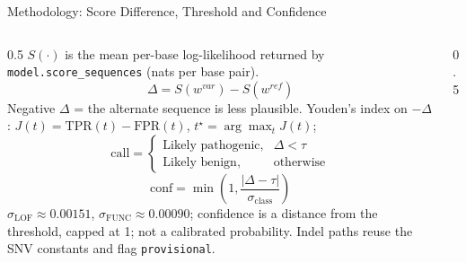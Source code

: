 \documentclass[aspectratio=169,10pt]{beamer}
\begin{document}
\begin{frame}{Methodology: Score Difference, Threshold and Confidence}
\begin{columns}[T]
\begin{column}{0.5\textwidth}
\small $S(\cdot)$ is the mean per-base log-likelihood returned by \texttt{model.score\_sequences} (nats per base pair).
\begin{equation*}
\boxed{\Delta = S(w^{var}) - S(w^{ref})}
\end{equation*}
\small Negative $\Delta$ = the alternate sequence is less plausible.
Youden's index on $-\Delta$: $J(t)=\mathrm{TPR}(t)-\mathrm{FPR}(t)$, $t^{\star}=\arg\max_t J(t)$;
\begin{equation*}
\mathrm{call} = \begin{cases}\text{Likely pathogenic}, & \Delta < \tau\\ \text{Likely benign}, & \text{otherwise}\end{cases}
\end{equation*}
\begin{equation*}
\boxed{\mathrm{conf}=\min\left(1,\frac{|\Delta-\tau|}{\sigma_{\mathrm{class}}}\right)}
\end{equation*}
\small $\sigma_{\mathrm{LOF}}\approx0.00151$, $\sigma_{\mathrm{FUNC}}\approx0.00090$; confidence is a distance from the threshold, capped at 1; not a calibrated probability. Indel paths reuse the SNV constants and flag \texttt{provisional}.
\end{column}
\begin{column}{0.5\textwidth}
\centering
{}
\end{column}
\end{columns}
\end{frame}
\end{document}

